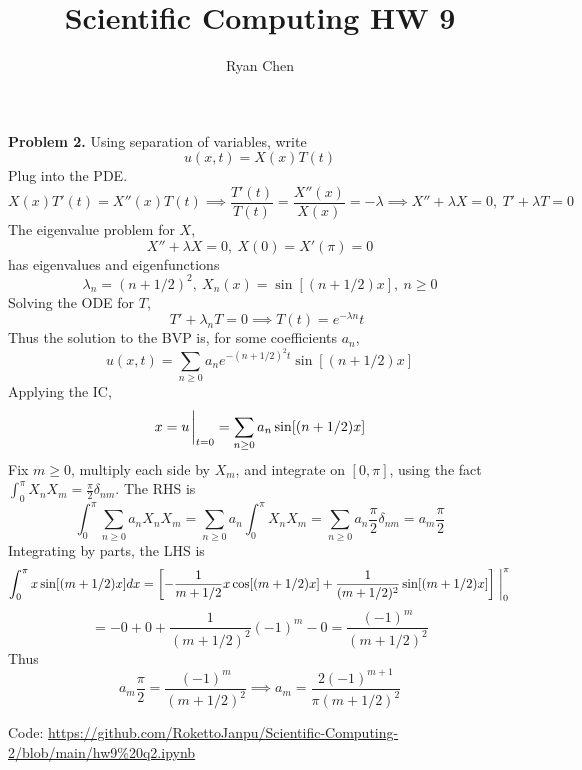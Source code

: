 \documentclass{article}
\title{Scientific Computing HW 9}
\author{Ryan Chen}
\def\tbf#1{\textbf{#1}}
\newcommand{\sbr}[1]{\left[#1\right]}
\newcommand{\imp}{\implies}
\begin{document}
	
\maketitle



\tbf{Problem 2.} Using separation of variables, write
$$u(x,t) = X(x)T(t)$$
Plug into the PDE.
$$X(x)T'(t) = X''(x)T(t)
\imp \frac{T'(t)}{T(t)} = \frac{X''(x)}{X(x)} = -\lambda
\imp X''+\lambda X=0,~T'+\lambda T=0$$
The eigenvalue problem for $X$,
$$X''+\lambda X = 0, ~X(0) = X'(\pi) = 0$$
has eigenvalues and eigenfunctions
$$\lambda_n = (n+1/2)^2,
~X_n(x) = \sin[(n+1/2)x],
~n\ge 0$$
Solving the ODE for $T$,
$$\quad T'+\lambda_n T=0
\imp T(t) = e^{-\lambda n}t$$
Thus the solution to the BVP is, for some coefficients $a_n$,
$$u(x,t) = \sum_{n\ge0}a_ne^{-(n+1/2)^2t}\sin[(n+1/2)x]$$
Applying the IC,
$$x = u\eval_{t=0} = \sum_{n\ge0}a_n\sin[(n+1/2)x]$$
Fix $m\ge0$, multiply each side by $X_m$, and integrate on $[0,\pi]$, using the fact $\int_0^\pi X_nX_m=\frac\pi2\delta_{nm}$. The RHS is
$$\int_0^\pi \sum_{n\ge0}a_nX_nX_m = \sum_{n\ge0}a_n\int_0^\pi X_nX_m
= \sum_{n\ge0}a_n\frac\pi2 \delta_{nm}
= a_m\frac\pi2$$
Integrating by parts, the LHS is
$$\int_0^\pi x\sin[(m+1/2)x]dx = \sbr{-\frac{1}{m+1/2}x\cos[(m+1/2)x] + \frac{1}{(m+1/2)^2}\sin[(m+1/2)x]}\eval_0^\pi$$
$$= -0 + 0 + \frac{1}{(m+1/2)^2}(-1)^{m} - 0
= \frac{(-1)^{m}}{(m+1/2)^2}$$
Thus
$$a_m\frac\pi2 = \frac{(-1)^{m}}{(m+1/2)^2}
\imp a_m = \frac{2(-1)^{m+1}}{\pi(m+1/2)^2}$$

Code:
\url{https://github.com/RokettoJanpu/Scientific-Computing-2/blob/main/hw9%20q2.ipynb}
\end{document}
